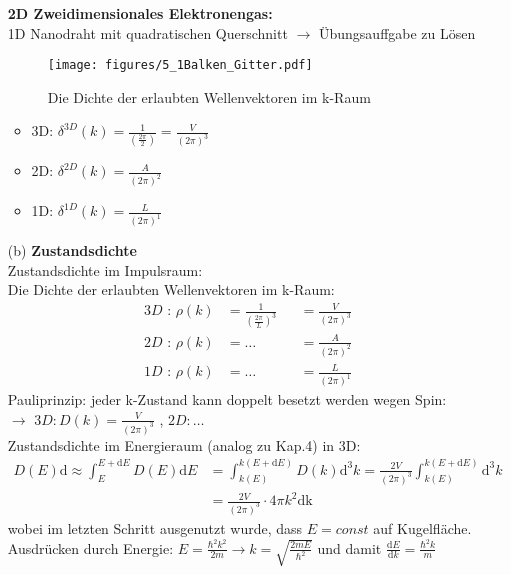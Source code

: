 \begin{itemize}
    \textbf{2D Zweidimensionales Elektronengas:} \\
    1D Nanodraht mit quadratischen Querschnitt $\rightarrow$ Übungsauffgabe zu Lösen
    \begin{figure}[]
        \centering
        \texttt{[image: figures/5\_1Balken\_Gitter.pdf]}
        \caption{Die Dichte der erlaubten Wellenvektoren im k-Raum}
        \label{}
    \end{figure}
    \begin{itemize}
        \item 3D: $\delta^{3D}(k) = \frac{1}{\left(\frac{2\pi}{2}\right)} = \frac{V}{(2\pi)^3}$
        \item 2D: $\delta^{2D}(k) = \frac{A}{(2\pi)^2}$
        \item 1D: $\delta^{1D}(k) = \frac{L}{(2\pi)^1}$
    \end{itemize}
    \item[(b)] \textbf{Zustandsdichte} \\
        Zustandsdichte im Impulsraum: \\
        Die Dichte der erlaubten Wellenvektoren im k-Raum:
        \begin{align}
            3D \text{ : } \rho(k) &= \frac{1}{\left(\frac{2\pi}{L}\right)^3} &&= \frac{V}{(2\pi)^3} \\
            2D \text{ : } \rho(k) &= \dots &&= \frac{A}{(2\pi)^2} \\
            1D \text{ : } \rho(k) &= \dots &&= \frac{L}{(2\pi)^1}
        \end{align}
        Pauliprinzip: jeder k-Zustand kann doppelt besetzt werden wegen Spin: \\
        $\rightarrow$ $ 3D : D(k) = \frac{V}{(2\pi)^3} $ , $ 2D : \dots $  \\
        Zustandsdichte im Energieraum (analog zu Kap.4) in 3D:
        \begin{align}
            D(E)\mathrm{d} \approx \int_E^{E+\mathrm{d}E} D(E)\mathrm{d}E &= \int_{k(E)}^{k(E+\mathrm{d}E)} D(k)\mathrm{d}^3k = \frac{2V}{(2\pi)^3} \int_{k(E)}^{k(E+\mathrm{d}E)} \mathrm{d}^3k \\
            &= \frac{2V}{(2\pi)^3} \cdot 4 \pi k^2 \mathrm{dk}
        \end{align}
        wobei im letzten Schritt ausgenutzt wurde, dass $E = const$ auf Kugelfläche. \\
        Ausdrücken durch Energie: $ E = \frac{\hbar^2k^2}{2m} \rightarrow k = \sqrt{\frac{2mE}{\hbar^2}}$ und damit $ \frac{\mathrm{d}E}{\mathrm{d}k} = \frac{\hbar^2k}{m}$ \\

\end{itemize}
